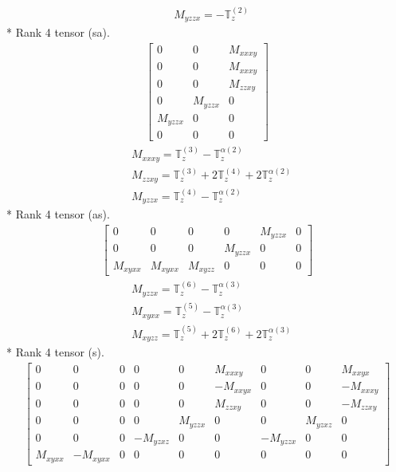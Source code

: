 \documentclass[fleqn,8pt,landscape]{jsarticle}
\begin{document}
\begin{align*}
& M_{yzzx} = - \mathbb{T}_{z}^{(2)}
\end{align*}
* Rank 4 tensor (sa).
\begin{align*}
\begin{bmatrix} 0 & 0 & M_{xxxy} \\ 0 & 0 & M_{xxxy} \\ 0 & 0 & M_{zzxy} \\ 0 & M_{yzzx} & 0 \\ M_{yzzx} & 0 & 0 \\ 0 & 0 & 0 \end{bmatrix}
\end{align*}
\begin{align*}
& M_{xxxy} = \mathbb{T}_{z}^{(3)} - \mathbb{T}_{z}^{\alpha(2)} \\
& M_{zzxy} = \mathbb{T}_{z}^{(3)} + 2 \mathbb{T}_{z}^{(4)} + 2 \mathbb{T}_{z}^{\alpha(2)} \\
& M_{yzzx} = \mathbb{T}_{z}^{(4)} - \mathbb{T}_{z}^{\alpha(2)}
\end{align*}
* Rank 4 tensor (as).
\begin{align*}
\begin{bmatrix} 0 & 0 & 0 & 0 & M_{yzzx} & 0 \\ 0 & 0 & 0 & M_{yzzx} & 0 & 0 \\ M_{xyxx} & M_{xyxx} & M_{xyzz} & 0 & 0 & 0 \end{bmatrix}
\end{align*}
\begin{align*}
& M_{yzzx} = \mathbb{T}_{z}^{(6)} - \mathbb{T}_{z}^{\alpha(3)} \\
& M_{xyxx} = \mathbb{T}_{z}^{(5)} - \mathbb{T}_{z}^{\alpha(3)} \\
& M_{xyzz} = \mathbb{T}_{z}^{(5)} + 2 \mathbb{T}_{z}^{(6)} + 2 \mathbb{T}_{z}^{\alpha(3)}
\end{align*}
* Rank 4 tensor (s).
\begin{align*}
\begin{bmatrix} 0 & 0 & 0 & 0 & 0 & M_{xxxy} & 0 & 0 & M_{xxyx} \\ 0 & 0 & 0 & 0 & 0 & - M_{xxyx} & 0 & 0 & - M_{xxxy} \\ 0 & 0 & 0 & 0 & 0 & M_{zzxy} & 0 & 0 & - M_{zzxy} \\ 0 & 0 & 0 & 0 & M_{yzzx} & 0 & 0 & M_{yzxz} & 0 \\ 0 & 0 & 0 & - M_{yzxz} & 0 & 0 & - M_{yzzx} & 0 & 0 \\ M_{xyxx} & - M_{xyxx} & 0 & 0 & 0 & 0 & 0 & 0 & 0 \end{bmatrix}
\end{align*}
\end{document}
